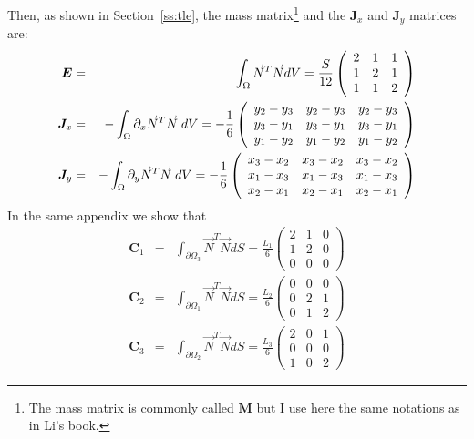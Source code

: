 Then, as shown in Section~\ref{ss:tle}, the mass matrix\footnote{The mass matrix is commonly called ${\bm M}$ 
but I use here the same notations as in Li's book.}  and the ${\bm J}_x$ and ${\bm J}_y$ matrices are:
\begin{eqnarray}
{\bm E} &=& \int_\Omega \vec{N}^T \vec{N} dV 
=\frac{S}{12} 
\left(
\begin{array}{ccc}
2 &1 &1\\ 
1 &2 &1\\
1 &1 &2
\end{array}
\right) \\
{\bm J}_x &=& - \int_{\Omega} \partial_x \vec{N}^T \vec{N}   \; dV 
=-\frac{1}{6}
\left(
\begin{array}{ccc}
y_2-y_3 & y_2-y_3 & y_2-y_3 \\
y_3-y_1 & y_3-y_1 & y_3-y_1 \\
y_1-y_2 & y_1-y_2 & y_1-y_2 
\end{array}
\right) \nonumber\\
{\bm J}_y &=&  - \int_{\Omega} \partial_y \vec{N}^T \vec{N}   \; dV  
=-\frac{1}{6} 
\left(
\begin{array}{ccc}
x_3-x_2 & x_3-x_2 & x_3-x_2 \\
x_1-x_3 & x_1-x_3 & x_1-x_3 \\
x_2-x_1 & x_2-x_1 & x_2-x_1 
\end{array}
\right)
\end{eqnarray}
In the same appendix we show that 
\begin{eqnarray}
{\bm C}_1 &=& \int_{\partial\Omega_3} \vec{N}^T\vec{N} dS 
= \frac{L_1}{6}
\left(
\begin{array}{ccc}
2 &1 &0\\
1 &2 &0\\
0 &0 &0
\end{array}
\right) \\ 
{\bm C}_2 &=& \int_{\partial\Omega_1} \vec{N}^T\vec{N} dS 
= \frac{L_2}{6}
\left(
\begin{array}{ccc}
0 &0 &0\\
0 &2 &1\\
0 &1 &2
\end{array}
\right) \\
{\bm C}_3 &=& \int_{\partial\Omega_2} \vec{N}^T\vec{N} dS 
= \frac{L_3}{6}
\left(
\begin{array}{ccc}
2 &0 &1\\
0 &0 &0\\
1 &0 &2
\end{array}
\right) 
\end{eqnarray}


